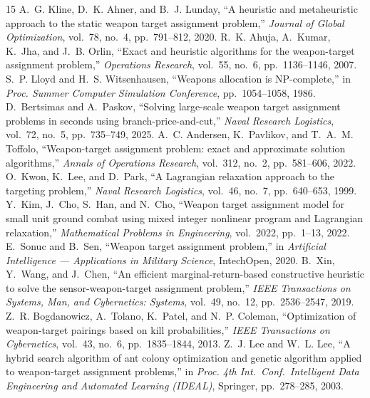 \documentclass[10pt,conference]{IEEEtran}
\begin{document}
\clearpage

\IEEEtriggercmd{\enlargethispage{-5in}}
\begin{thebibliography}{15}
 A.~G. Kline, D.~K. Ahner, and B.~J. Lunday, ``A heuristic and metaheuristic approach to the static weapon target assignment problem,'' \textit{Journal of Global Optimization}, vol.~78, no.~4, pp.~791--812, 2020.
 R.~K. Ahuja, A.~Kumar, K.~Jha, and J.~B. Orlin, ``Exact and heuristic algorithms for the weapon-target assignment problem,'' \textit{Operations Research}, vol.~55, no.~6, pp.~1136--1146, 2007.
 S.~P. Lloyd and H.~S. Witsenhausen, ``Weapons allocation is NP-complete,'' in \textit{Proc. Summer Computer Simulation Conference}, pp.~1054--1058, 1986.
 D.~Bertsimas and A.~Paskov, ``Solving large-scale weapon target assignment problems in seconds using branch-price-and-cut,'' \textit{Naval Research Logistics}, vol.~72, no.~5, pp.~735--749, 2025.
 A.~C. Andersen, K.~Pavlikov, and T.~A.~M. Toffolo, ``Weapon-target assignment problem: exact and approximate solution algorithms,'' \textit{Annals of Operations Research}, vol.~312, no.~2, pp.~581--606, 2022.
 O.~Kwon, K.~Lee, and D.~Park, ``A Lagrangian relaxation approach to the targeting problem,'' \textit{Naval Research Logistics}, vol.~46, no.~7, pp.~640--653, 1999.
 Y.~Kim, J.~Cho, S.~Han, and N.~Cho, ``Weapon target assignment model for small unit ground combat using mixed integer nonlinear program and Lagrangian relaxation,'' \textit{Mathematical Problems in Engineering}, vol.~2022, pp.~1--13, 2022.
 E.~Sonuc and B.~Sen, ``Weapon target assignment problem,'' in \textit{Artificial Intelligence --- Applications in Military Science}, IntechOpen, 2020.
 B.~Xin, Y.~Wang, and J.~Chen, ``An efficient marginal-return-based constructive heuristic to solve the sensor-weapon-target assignment problem,'' \textit{IEEE Transactions on Systems, Man, and Cybernetics: Systems}, vol.~49, no.~12, pp.~2536--2547, 2019.
 Z.~R. Bogdanowicz, A.~Tolano, K.~Patel, and N.~P. Coleman, ``Optimization of weapon-target pairings based on kill probabilities,'' \textit{IEEE Transactions on Cybernetics}, vol.~43, no.~6, pp.~1835--1844, 2013.
 Z.~J. Lee and W.~L. Lee, ``A hybrid search algorithm of ant colony optimization and genetic algorithm applied to weapon-target assignment problems,'' in \textit{Proc. 4th Int.\ Conf.\ Intelligent Data Engineering and Automated Learning (IDEAL)}, Springer, pp.~278--285, 2003.

\end{thebibliography}
\end{document}
